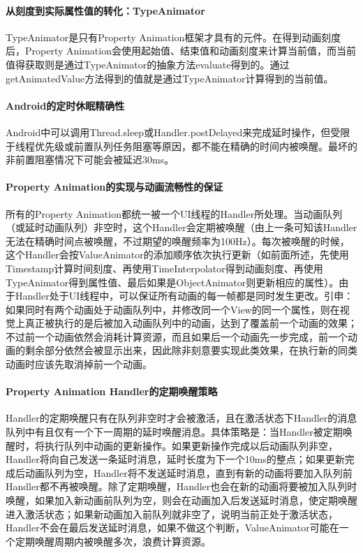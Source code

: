 \documentclass[UTF8]{ctexart}
\begin{document}
    \paragraph{从刻度到实际属性值的转化：TypeAnimator}
    TypeAnimator是只有Property Animation框架才具有的元件。在得到动画刻度后，Property Animation会使用起始值、结束值和动画刻度来计算当前值，而当前值得获取则是通过TypeAnimator的抽象方法evaluate得到的。通过getAnimatedValue方法得到的值就是通过TypeAnimator计算得到的当前值。
    \paragraph{Android的定时休眠精确性}
    Android中可以调用Thread.sleep或Handler.postDelayed来完成延时操作，但受限于线程优先级或前置队列任务阻塞等原因，都不能在精确的时间内被唤醒。最坏的非前置阻塞情况下可能会被延迟30ms。
    \paragraph{Property Animation的实现与动画流畅性的保证}
    所有的Property Animation都统一被一个UI线程的Handler所处理。当动画队列（或延时动画队列）非空时，这个Handler会定期被唤醒（由上一条可知该Handler无法在精确时间点被唤醒，不过期望的唤醒频率为100Hz）。每次被唤醒的时候，这个Handler会按ValueAnimator的添加顺序依次执行更新（如前面所述，先使用Timestamp计算时间刻度、再使用TimeInterpolator得到动画刻度、再使用TypeAnimator得到属性值、最后如果是ObjectAnimator则更新相应的属性）。由于Handler处于UI线程中，可以保证所有动画的每一帧都是同时发生更改。引申：如果同时有两个动画处于动画队列中，并修改同一个View的同一个属性，则在视觉上真正被执行的是后被加入动画队列中的动画，达到了覆盖前一个动画的效果；不过前一个动画依然会消耗计算资源，而且如果后一个动画先一步完成，前一个动画的剩余部分依然会被显示出来，因此除非刻意要实现此类效果，在执行新的同类动画时应该先取消掉前一个动画。
    \paragraph{Property Animation Handler的定期唤醒策略}
    Handler的定期唤醒只有在队列非空时才会被激活，且在激活状态下Handler的消息队列中有且仅有一个下一周期的延时唤醒消息。具体策略是：当Handler被定期唤醒时，将执行队列中动画的更新操作。如果更新操作完成以后动画队列非空，Handler将向自己发送一条延时消息，延时长度为下一个10ms的整点；如果更新完成后动画队列为空，Handler将不发送延时消息，直到有新的动画将要加入队列前Handler都不再被唤醒。除了定期唤醒，Handler也会在新的动画将要被加入队列时唤醒，如果加入新动画前队列为空，则会在动画加入后发送延时消息，使定期唤醒进入激活状态；如果新动画加入前队列就非空了，说明当前正处于激活状态，Handler不会在最后发送延时消息，如果不做这个判断，ValueAnimator可能在一个定期唤醒周期内被唤醒多次，浪费计算资源。
\end{document}
